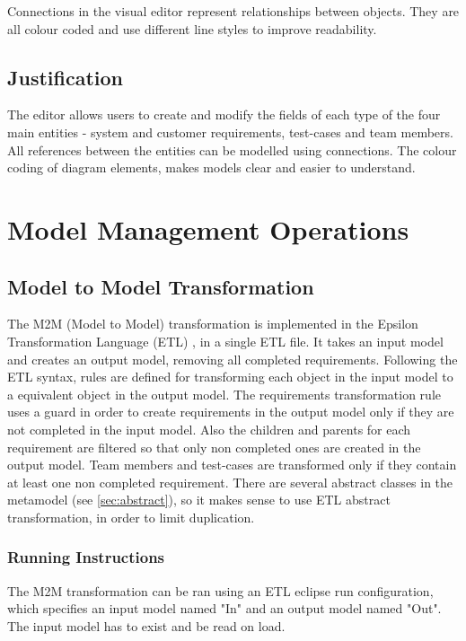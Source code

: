 \documentclass[11pt,a4paper]{article}
\begin{document}
	Connections in the visual editor represent relationships between objects. They are all colour coded and use different line styles to improve readability.
	
	\subsection{Justification}
	The editor allows users to create and modify the fields of each type of the four main entities - system and customer requirements, test-cases and team members. All references between the entities can be modelled using connections. The colour coding of diagram elements, makes models clear and easier to understand.


	\section{Model Management Operations}
	
	\subsection{Model to Model Transformation}
	The M2M (Model to Model) transformation is implemented in the Epsilon Transformation Language (ETL) \cite{etl}, in a single ETL file. It takes an input model and creates an output model, removing all completed requirements. Following the ETL syntax, rules are defined for transforming each object in the input model to a equivalent object in the output model. The requirements transformation rule uses a guard in order to create requirements in the output model only if they are not completed in the input model. Also the children and parents for each requirement are filtered so that only non completed ones are created in the output model. Team members and test-cases are transformed only if they contain at least one non completed requirement. There are several abstract classes in the metamodel (see \autoref{sec:abstract}), so it makes sense to use ETL abstract transformation, in order to limit duplication.
	
	\subsubsection{Running Instructions}
	The M2M transformation can be ran using an ETL eclipse run configuration, which specifies an input model named "In" and an output model named "Out". The input model has to exist and be read on load.
	
\end{document}
